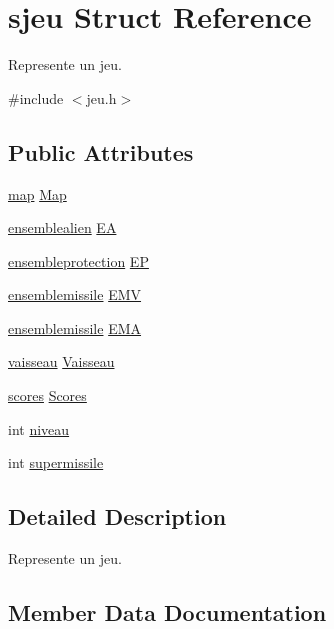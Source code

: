 \hypertarget{structsjeu}{}\section{sjeu Struct Reference}
\label{structsjeu}


Represente un jeu.  




{\ttfamily \#include $<$jeu.\+h$>$}

\subsection*{Public Attributes}
\begin{DoxyCompactItemize}
\item 
\hyperlink{structsmap}{map} \hyperlink{structsjeu_a3eee98c8fb0632fb0350d497e6ad4776}{Map}
\item 
\hyperlink{structsensemblealien}{ensemblealien} \hyperlink{structsjeu_add6abf2e70714430efb1108a0f63daf0}{EA}
\item 
\hyperlink{structsensembleprotection}{ensembleprotection} \hyperlink{structsjeu_ac4a070a02abe19dc3282f458b71f5186}{EP}
\item 
\hyperlink{structsensemblemissile}{ensemblemissile} \hyperlink{structsjeu_a6a19047799eb7951b5451deea2dd39a0}{E\+MV}
\item 
\hyperlink{structsensemblemissile}{ensemblemissile} \hyperlink{structsjeu_af19408961a6725fe4685d1c01ec8a2d9}{E\+MA}
\item 
\hyperlink{structsvaisseau}{vaisseau} \hyperlink{structsjeu_af17c0c22c50196e3aec2f1d243a4c900}{Vaisseau}
\item 
\hyperlink{structsscores}{scores} \hyperlink{structsjeu_a7c9cb778d1b512ae940ab378f14a1942}{Scores}
\item 
int \hyperlink{structsjeu_a7bb23f0ca4e1c3c0161222bcdddc4dae}{niveau}
\item 
int \hyperlink{structsjeu_a2fe3935f24c9e3e1de88864b06141950}{supermissile}
\end{DoxyCompactItemize}


\subsection{Detailed Description}
Represente un jeu. 

\subsection{Member Data Documentation}
